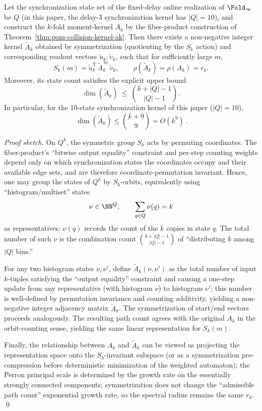\begin{proposition}\label{prop:pom-ak-symmetric-compression}
Let the synchronization state set of the fixed-delay online realization of $\Fold_\infty$ be $Q$ (in this paper, the delay-$3$ synchronization kernel has $|Q|=10$), and construct the $k$-fold moment-kernel \(A_k\) by the fiber-product construction of Theorem~\ref{thm:pom-collision-kernel-ak}.
Then there exists a non-negative integer kernel \(\widetilde A_k\) obtained by symmetrization (quotienting by the $S_k$ action) and corresponding readout vectors \(\widetilde u_k,\widetilde v_k\), such that for sufficiently large $m$,
\[
S_k(m)=\widetilde u_k^{\mathsf T}\,\widetilde A_k^{\,m}\,\widetilde v_k,
\qquad
\rho(\widetilde A_k)=\rho(A_k)=r_k.
\]
Moreover, its state count satisfies the explicit upper bound
\[
\dim(\widetilde A_k)\ \le\ \binom{k+|Q|-1}{|Q|-1}.
\]
In particular, for the 10-state synchronization kernel of this paper ($|Q|=10$),
\[
\boxed{\ \dim(\widetilde A_k)\le \binom{k+9}{9}=O(k^9)\ }.
\]
\end{proposition}
\begin{proof}[Proof sketch]
On $Q^k$, the symmetric group $S_k$ acts by permuting coordinates. The fiber-product's ``bitwise output equality'' constraint and per-step counting weights depend only on which synchronization states the coordinates occupy and their available edge sets, and are therefore coordinate-permutation invariant. Hence, one may group the states of $Q^k$ by $S_k$-orbits, equivalently using ``histogram/multiset'' states
\[
\nu\in\NN^{Q},\qquad \sum_{q\in Q}\nu(q)=k
\]
as representatives: $\nu(q)$ records the count of the $k$ copies in state $q$. The total number of such $\nu$ is the combination count \(\binom{k+|Q|-1}{|Q|-1}\) of ``distributing $k$ among $|Q|$ bins.''

For any two histogram states $\nu,\nu'$, define \(\widetilde A_k(\nu,\nu')\) as the total number of input $k$-tuples satisfying the ``output equality'' constraint and causing a one-step update from any representative (with histogram $\nu$) to histogram $\nu'$; this number is well-defined by permutation invariance and counting additivity, yielding a non-negative integer adjacency matrix \(\widetilde A_k\). The symmetrization of start/end vectors proceeds analogously. The resulting path count agrees with the original $A_k$ in the orbit-counting sense, yielding the same linear representation for $S_k(m)$.

Finally, the relationship between $A_k$ and $\widetilde A_k$ can be viewed as projecting the representation space onto the $S_k$-invariant subspace (or as a symmetrization pre-compression before deterministic minimization of the weighted automaton); the Perron principal scale is determined by the growth rate on the essentially strongly connected components; symmetrization does not change the ``admissible path count'' exponential growth rate, so the spectral radius remains the same \(r_k\). \qed
\end{proof}

